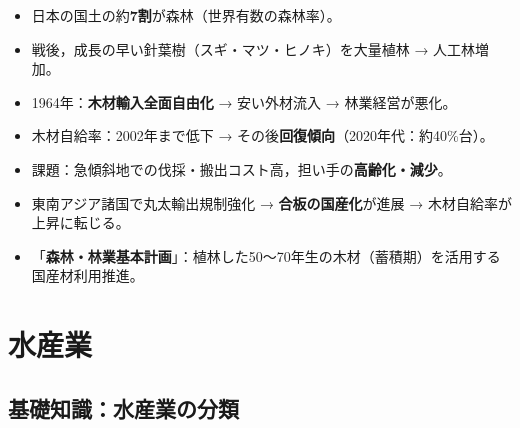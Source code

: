\documentclass[a4paper,11pt]{article}
\newcommand{\imp}[1]{\textbf{\textcolor{mainred}{#1}}}
\newcommand{\key}[1]{\textbf{\textcolor{mainblue}{#1}}}
\begin{document}
\begin{tcolorbox}[sectionbox, title={日本の林業の現状と課題}]
\begin{itemize}[leftmargin=1em]
  \item 日本の国土の約\imp{7割}が森林（世界有数の森林率）。
  \item 戦後，成長の早い針葉樹（スギ・マツ・ヒノキ）を大量植林 → 人工林増加。
  \item 1964年：\imp{木材輸入全面自由化} → 安い外材流入 → 林業経営が悪化。
  \item 木材自給率：2002年まで低下 → その後\imp{回復傾向}（2020年代：約40\%台）。
  \item 課題：急傾斜地での伐採・搬出コスト高，担い手の\imp{高齢化・減少}。
  \item 東南アジア諸国で丸太輸出規制強化 → \imp{合板の国産化}が進展 → 木材自給率が上昇に転じる。
  \item 「\key{森林・林業基本計画}」：植林した50〜70年生の木材（蓄積期）を活用する国産材利用推進。
\end{itemize}
\end{tcolorbox}

\vspace{2mm}

\section{水産業}

\subsection{基礎知識：水産業の分類}
\end{document}
